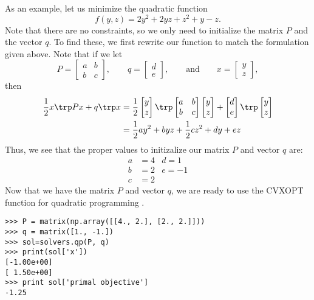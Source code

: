As an example, let us minimize the quadratic function
\[
f(y,z) = 2y^2 +2yz + z^2 +y -z.
\]
Note that there are no constraints, so we only need to initialize the matrix $P$ and the vector $q$.
To find these, we first rewrite our function to match the formulation given above. 
Note that if we let
\[
P = \begin{bmatrix}
  a & b\\
  b & c
\end{bmatrix}, \qquad 
q = \begin{bmatrix}
  d\\
  e
\end{bmatrix},
\qquad \text{and} \qquad
x = \begin{bmatrix}
  y\\
  z
\end{bmatrix},
\]
then 
\begin{align*}
\frac{1}{2}x\trp Px + q\trp x &= 
\frac{1}{2}
\begin{bmatrix}
  y\\
  z
\end{bmatrix}\trp 
\begin{bmatrix}
  a & b\\
  b & c
\end{bmatrix}
\begin{bmatrix}
  y\\
  z
\end{bmatrix} + 
\begin{bmatrix}
  d\\
  e
\end{bmatrix}\trp 
\begin{bmatrix}
  y\\
  z
\end{bmatrix} \\
&= \frac{1}{2}ay^2+byz+\frac{1}{2}cz^2+dy+ez
\end{align*}
Thus, we see that the proper values to initizalize our matrix $P$ and vector $q$ are:
\begin{align*}
a &= 4  &d = 1 \\
b &= 2  &e = -1 \\
c &= 2 
\end{align*}
Now that we have the matrix $P$ and vector $q$, we are ready to use the CVXOPT function for quadratic programming .
\begin{lstlisting}
>>> P = matrix(np.array([[4., 2.], [2., 2.]]))
>>> q = matrix([1., -1.])
>>> sol=solvers.qp(P, q)
>>> print(sol['x'])
[-1.00e+00]
[ 1.50e+00]
>>> print sol['primal objective']
-1.25
\end{lstlisting}

